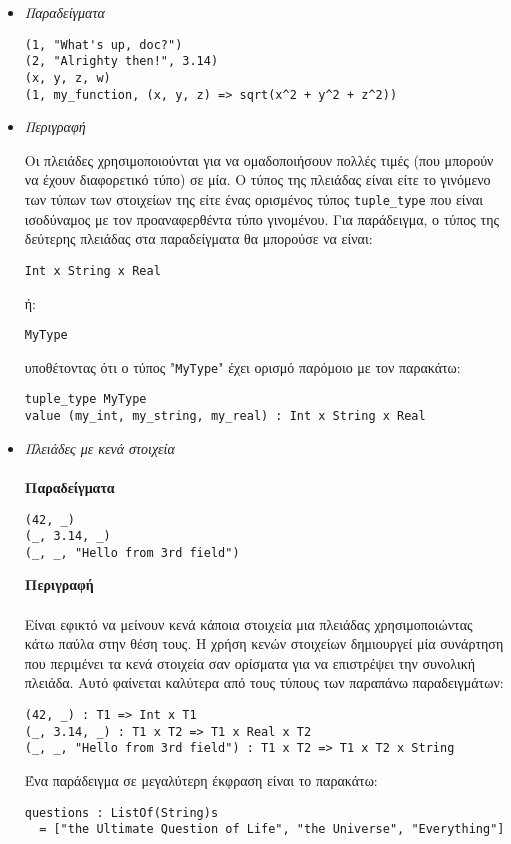 \documentclass[diploma]{softlab-thesis}
\begin{document}
\begin{itemize}

\item \textit{Παραδείγματα}
\begin{verbatim}
(1, "What's up, doc?")
(2, "Alrighty then!", 3.14)
(x, y, z, w)
(1, my_function, (x, y, z) => sqrt(x^2 + y^2 + z^2))
\end{verbatim}

\item \textit{Περιγραφή}

Οι πλειάδες χρησιμοποιούνται για να ομαδοποιήσουν πολλές τιμές (που μπορούν
να έχουν διαφορετικό τύπο) σε μία. Ο τύπος της πλειάδας είναι είτε το γινόμενο
των τύπων των στοιχείων της είτε ένας ορισμένος τύπος \verb|tuple_type|
που είναι ισοδύναμος με τον προαναφερθέντα τύπο γινομένου.
Για παράδειγμα, ο τύπος της δεύτερης πλειάδας στα παραδείγματα θα μπορούσε να
είναι:
\begin{verbatim}
Int x String x Real
\end{verbatim}
ή:
\begin{verbatim}
MyType
\end{verbatim}
υποθέτοντας ότι ο τύπος "\verb|MyType|" έχει ορισμό παρόμοιο με τον παρακάτω:
\begin{verbatim}
tuple_type MyType
value (my_int, my_string, my_real) : Int x String x Real
\end{verbatim}

\newpage
\item \textit{Πλειάδες με κενά στοιχεία}
\\\\
\textbf{Παραδείγματα}
\begin{verbatim}
(42, _)
(_, 3.14, _)
(_, _, "Hello from 3rd field")
\end{verbatim}

\textbf{Περιγραφή}
\\\\
Είναι εφικτό να μείνουν κενά κάποια στοιχεία μια πλειάδας χρησιμοποιώντας
κάτω παύλα στην θέση τους. Η χρήση κενών στοιχείων δημιουργεί μία συνάρτηση
που περιμένει τα κενά στοιχεία σαν ορίσματα για να επιστρέψει την συνολική
πλειάδα. Αυτό φαίνεται καλύτερα από τους τύπους των παραπάνω παραδειγμάτων:
\begin{verbatim}
(42, _) : T1 => Int x T1
(_, 3.14, _) : T1 x T2 => T1 x Real x T2
(_, _, "Hello from 3rd field") : T1 x T2 => T1 x T2 x String
\end{verbatim}
Ένα παράδειγμα σε μεγαλύτερη έκφραση είναι το παρακάτω:
\begin{verbatim}
questions : ListOf(String)s
  = ["the Ultimate Question of Life", "the Universe", "Everything"]


\end{verbatim}
\end{itemize}
\end{document}
